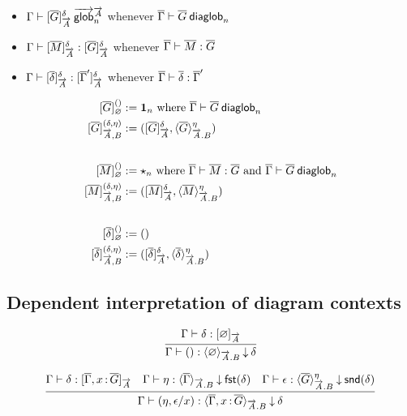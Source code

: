 \begin{itemize}
\item ${\Gamma} \vdash {[{\ensuremath{\overline{G}}}]_{\ensuremath{\overrightarrow{A}}}^{\delta}} \: \overrightarrow{\mathsf{glob}}^{\overrightarrow{A}}_{n}$ 
whenever ${\overline{\Gamma}} \vdash {\ensuremath{\overline{G}}} \: \mathsf{diaglob}_{n}$

\item ${\Gamma} \vdash {[{\ensuremath{\overline{M}}}]_{\ensuremath{\overrightarrow{A}}}^{\delta}} : {[{\overline{G}}]_{\overrightarrow{A}}^{\delta}}$
whenever ${\overline{\Gamma}} \vdash {\ensuremath{\overline{M}}} : {\overline{G}}$

\item ${\Gamma} \vdash {[{\ensuremath{\overline{\delta}}}]_{\ensuremath{\overrightarrow{A}}}^{\delta}} : {[{\overline{\Gamma}'}]_{\overrightarrow{A}}^{\delta}}$
whenever ${\overline{\Gamma}} \vdash {\ensuremath{\overline{\delta}}} : {\overline{\Gamma}'}$
\end{itemize}

\[\begin{aligned}
\interpglob{\diag G}{\emptytel}{()} &:=
\unitglob n \text{ where $\wfdiaglob{\diag\Gamma}{\diag G}{n}$} \\
\interpglob{\diag G}{\tel A,B}{(\delta,\eta)} & :=
(\interpglob{\diag G}{\tel A}{\delta},\interpdepglob{\diag G}{\tel A.B}{\eta})\\
&\\
\interpglob{\diag M}{\emptytel}{()} &:=
\unitglobelt n \text{ where $\ofdiaglob{\diag\Gamma}{\diag M}{\diag G}$ and 
$\wfdiaglob{\diag\Gamma}{\diag G}{n}$} \\
\interpglob{\diag M}{\tel A,B}{(\delta,\eta)} & :=
(\interpglob{\diag M}{\tel A}{\delta},\interpdepglob{\diag M}{\tel A.B}{\eta})\\
&\\
\interpglob{\diag\delta}{\emptytel}{()} &:= () \\
\interpglob{\diag\delta}{\tel A,B}{(\delta,\eta)} & :=
(\interpglob{\diag\delta}{\tel A}{\delta},\interpdepglob{\diag\delta}{\tel A.B}{\eta})
\end{aligned}\]

\subsection{Dependent interpretation of diagram contexts}

\[\infer
  {\ofinterpdep{\Gamma}{()}{\emptyctx}{\tel A.B}{\delta}}
  {\ofinterp{\Gamma}{\delta}{\emptyctx}{\tel A}}
\]

\[
\infer
  {\ofinterpdep{\Gamma}{(\eta,\epsilon/x)}
   {\diag\Gamma,\tptm{x}{\diag G}}{\tel A.B}{\delta}}
  {\ofinterp{\Gamma}{\delta}{\diag\Gamma,\tptm{x}{\diag G}}{\tel A}
  &\ofinterpdep{\Gamma}{\eta}{\diag\Gamma}{\tel A.B}{\fstinterp\delta}
  &\ofdepglob{\Gamma}{\epsilon}
   {\interpdepglob{\diag G}{\tel A.B}{\eta}}{\sndinterp\delta}}
\]

